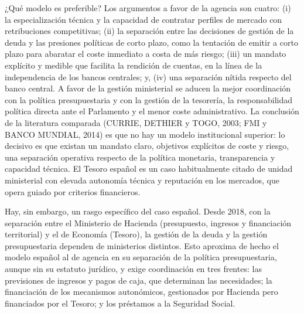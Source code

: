 \documentclass[10pt,a4paper]{article}
\begin{document}
¿Qué modelo es preferible? Los argumentos a favor de la agencia son cuatro: (i) la especialización técnica y la capacidad de contratar perfiles de mercado con retribuciones competitivas; (ii) la separación entre las decisiones de gestión de la deuda y las presiones políticas de corto plazo, como la tentación de emitir a corto plazo para abaratar el coste inmediato a costa de más riesgo; (iii) un mandato explícito y medible que facilita la rendición de cuentas, en la línea de la independencia de los bancos centrales; y, (iv) una separación nítida respecto del banco central. A favor de la gestión ministerial se aducen la mejor coordinación con la política presupuestaria y con la gestión de la tesorería, la responsabilidad política directa ante el Parlamento y el menor coste administrativo. La conclusión de la literatura comparada (CURRIE, DETHIER y TOGO, 2003; FMI y BANCO MUNDIAL, 2014) es que no hay un modelo institucional superior: lo decisivo es que existan un mandato claro, objetivos explícitos de coste y riesgo, una separación operativa respecto de la política monetaria, transparencia y capacidad técnica. El Tesoro español es un caso habitualmente citado de unidad ministerial con elevada autonomía técnica y reputación en los mercados, que opera guiado por criterios financieros.

Hay, sin embargo, un rasgo específico del caso español. Desde 2018, con la separación entre el Ministerio de Hacienda (presupuesto, ingresos y financiación territorial) y el de Economía (Tesoro), la gestión de la deuda y la gestión presupuestaria dependen de ministerios distintos. Esto aproxima de hecho el modelo español al de agencia en su separación de la política presupuestaria, aunque sin su estatuto jurídico, y exige coordinación en tres frentes: las previsiones de ingresos y pagos de caja, que determinan las necesidades; la financiación de los mecanismos autonómicos, gestionados por Hacienda pero financiados por el Tesoro; y los préstamos a la Seguridad Social.
\end{document}
